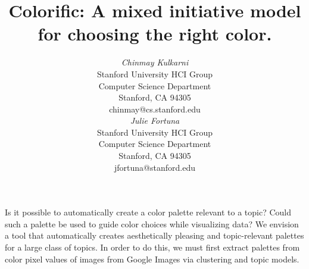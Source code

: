 \documentclass{article}
\begin{document}

 \toappear{}


\title{Colorific: A mixed initiative model for choosing the right color.}


\author{
\parbox[t]{9cm}{\centering
	     {\em Chinmay Kulkarni}\\
	     Stanford University HCI Group\\
              Computer Science Department\\
	     Stanford, CA 94305\\
	     chinmay@cs.stanford.edu}
\parbox[t]{9cm}{\centering
	     {\em Julie Fortuna}\\
	     Stanford University HCI Group\\
              Computer Science Department\\
	     Stanford, CA 94305\\
	     jfortuna@stanford.edu}
}

\maketitle

\abstract
Is it possible to automatically create a color palette relevant to a topic? Could such a palette be used to guide color choices while visualizing data? We envision a tool that automatically creates aesthetically pleasing and topic-relevant palettes for a  large class of topics. In order to do this, we must first extract palettes from color pixel values of images from Google Images via clustering and topic models. 

\end{document}
